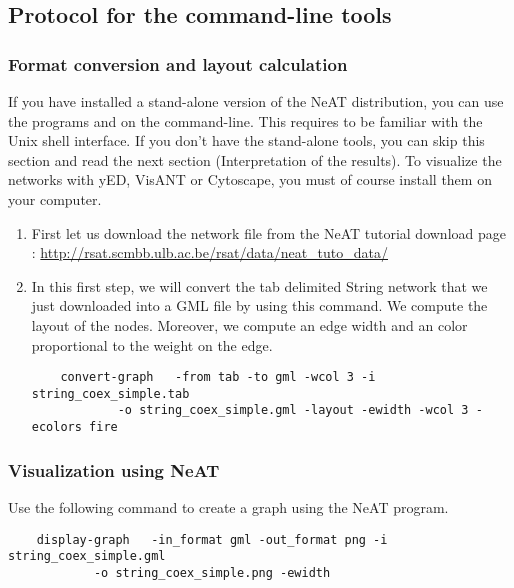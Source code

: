 \subsection{Protocol for the command-line tools}
\subsubsection{Format conversion and layout calculation}
If you have installed a stand-alone version of the NeAT distribution,
you can use the programs  and  on the
command-line. This requires to be familiar with the Unix shell
interface. If you don't have the stand-alone tools, you can skip this
section and read the next section (Interpretation of the results). To visualize the networks with yED, VisANT or Cytoscape, you
must of course install them on your computer.


\begin{enumerate}
\item First let us download the network file  from the NeAT tutorial download page : \url{http://rsat.scmbb.ulb.ac.be/rsat/data/neat\_tuto\_data/} 
\item In this first step, we will convert the tab delimited String network that we just downloaded into a GML file by using this command. We compute the layout of the nodes. Moreover, we compute an edge width and an color proportional to the weight on the edge.
	{\color{Blue} \begin{footnotesize} 
		\begin{verbatim}
	convert-graph 	-from tab -to gml -wcol 3 -i string_coex_simple.tab 
			-o string_coex_simple.gml -layout -ewidth -wcol 3 -ecolors fire
		\end{verbatim} \end{footnotesize}
	}	

\end{enumerate}


\subsubsection{Visualization using NeAT}
Use the following command to create a graph using the NeAT  program.
	{\color{Blue} \begin{footnotesize} 
		\begin{verbatim}
	display-graph 	-in_format gml -out_format png -i string_coex_simple.gml
			-o string_coex_simple.png -ewidth
		\end{verbatim} \end{footnotesize}
	}


